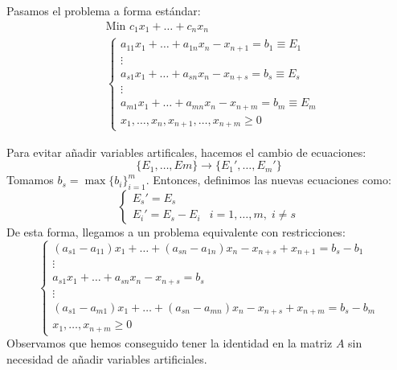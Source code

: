 Pasamos el problema a forma estándar:
\begin{align*}
     & \text{Min } c_1x_1 + \dots + c_nx_n                      \\
     & \begin{cases}
           a_{11}x_1 + \dots + a_{1n}x_n - x_{n+1} = b_1 \equiv E_1 \\
           \vdots                                                   \\
           a_{s1}x_1 + \dots + a_{sn}x_n - x_{n+s} = b_s \equiv E_s \\
           \vdots                                                   \\
           a_{m1}x_1 + \dots + a_{mn}x_n - x_{n+m} = b_m \equiv E_m \\
           x_1, \dots, x_n, x_{n+1}, \dots, x_{n+m} \geq 0
       \end{cases}
\end{align*}

Para evitar añadir variables artificales, hacemos el cambio de ecuaciones:
$$\{E_1, \dots, Em\} \to \{E_1', \dots, E_m'\}$$
Tomamos $b_s = \max\{b_i\}_{i=1}^m$.
Entonces, definimos las nuevas ecuaciones como:
$$\begin{cases}
        E_s' = E_s                                      \\
        E_i' = E_s - E_i & i = 1, \dots, m, \; i \neq s
    \end{cases}$$
De esta forma, llegamos a un problema equivalente con restricciones:
$$\begin{cases}
        (a_{s1}-a_{11})x_1 + \dots + (a_{sn}-a_{1n})x_n - x_{n+s} + x_{n+1} = b_s - b_1 \\
        \vdots                                                                          \\
        a_{s1}x_1 + \dots + a_{sn}x_n - x_{n+s} = b_s                                   \\
        \vdots                                                                          \\
        (a_{s1}-a_{m1})x_1 + \dots + (a_{sn}-a_{mn})x_n - x_{n+s} + x_{n+m} = b_s - b_m \\
        x_1, \dots, x_{n+m} \geq 0
    \end{cases}$$
Observamos que hemos conseguido tener la identidad en la matriz $A$ sin necesidad de añadir variables artificiales.